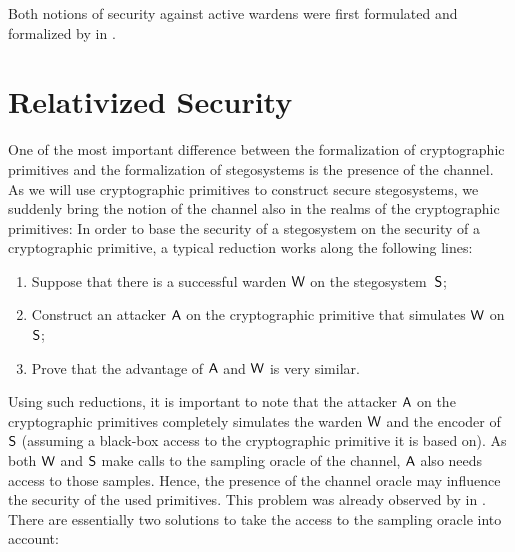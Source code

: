 Both notions of security against active wardens were first formulated
and formalized by \citeauthor{backes2005active} in
\cite{backes2005active}. 


\section{Relativized Security}
\label{sec:relativized}
One of the most important difference between the formalization of
cryptographic primitives and the formalization of stegosystems is the
presence of the channel. As we will use cryptographic primitives to
construct secure stegosystems, we suddenly bring the notion of the
channel also in the realms of the cryptographic
primitives: In order to base the security of a stegosystem on
the security of a cryptographic primitive, a typical reduction works
along the following lines:
\begin{enumerate}
\item  Suppose that there is a successful warden $\operatorname{\mathsf{W}}$
on the stegosystem~$\operatorname{\mathsf{S}}$;
\item  Construct an attacker $\operatorname{\mathsf{A}}$ on the cryptographic
primitive that simulates $\operatorname{\mathsf{W}}$ on $\operatorname{\mathsf{S}}$;
\item Prove that the advantage of $\operatorname{\mathsf{A}}$ and $\operatorname{\mathsf{W}}$
is very similar.
\end{enumerate}
Using such reductions, it is important to note that the attacker $\operatorname{\mathsf{A}}$
on the cryptographic primitives completely simulates the warden $\operatorname{\mathsf{W}}$
and the encoder of $\operatorname{\mathsf{S}}$ (assuming a black-box access to the
cryptographic primitive it is based on). As both $\operatorname{\mathsf{W}}$ and $\operatorname{\mathsf{S}}$
make calls to the sampling oracle of the channel, $\operatorname{\mathsf{A}}$ also needs
access to those samples.  Hence, the presence of the channel oracle may
influence the security of the used primitives.  This problem was already
observed by \citeauthor{hopper2009provably} in
\cite{hopper2009provably}. There are essentially two solutions to take
the access to the sampling oracle into account:
